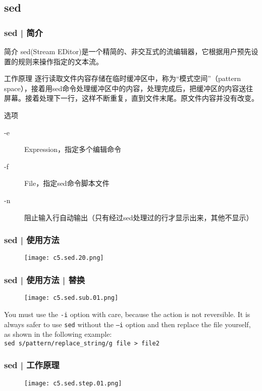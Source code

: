 \subsection{sed}
\begin{frame}
  \frametitle{sed | 简介}
  \begin{block}{简介}
    sed(Stream EDitor)是一个精简的、非交互式的流编辑器，它根据用户预先设置的规则来操作指定的文本流。
  \end{block}
  \pause
  \begin{block}{工作原理}
    逐行读取文件内容存储在临时缓冲区中，称为“模式空间”（pattern space），接着用sed命令处理缓冲区中的内容，处理完成后，把缓冲区的内容送往屏幕。接着处理下一行，这样不断重复，直到文件末尾。原文件内容并没有改变。
  \end{block}
  \pause
  \begin{block}{\alert{选项}}
    \begin{description}
      \item[-e] Expression，指定多个编辑命令
      \item[-f] File，指定sed命令脚本文件
      \item[-n] 阻止输入行自动输出（只有经过sed处理过的行才显示出来，其他不显示）
    \end{description}
  \end{block}
\end{frame}

\begin{frame}
  \frametitle{sed | 使用方法}
  \begin{figure}
    \centering
    \texttt{[image: c5.sed.20.png]}
  \end{figure}
\end{frame}

\begin{frame}[fragile]
  \frametitle{sed | 使用方法 | 替换}
  \begin{figure}
    \centering
    \texttt{[image: c5.sed.sub.01.png]}
  \end{figure}
  You must use the \verb|-i| option with care, because the action is not reversible. It is always safer to use \verb|sed| without the \verb|–i| option and then replace the file yourself, as shown in the following example: \\ \verb|sed s/pattern/replace_string/g file > file2|
\end{frame}

\begin{frame}
  \frametitle{sed | 工作原理}
  \begin{figure}
    \centering
    \texttt{[image: c5.sed.step.01.png]}
  \end{figure}
\end{frame}

